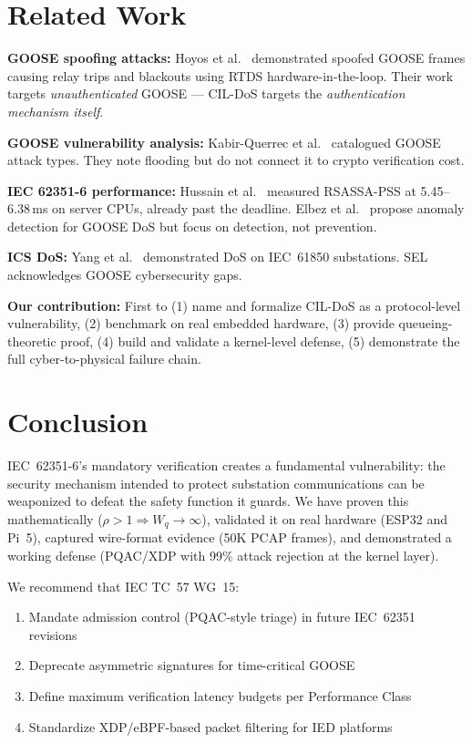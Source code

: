 \documentclass[11pt,a4paper,twocolumn]{article}
\begin{document}
\section{Related Work}
\label{sec:related}

\textbf{GOOSE spoofing attacks:} Hoyos et al.~\cite{tudelft2020} demonstrated spoofed GOOSE frames causing relay trips and blackouts using RTDS hardware-in-the-loop. Their work targets \emph{unauthenticated} GOOSE --- CIL-DoS targets the \emph{authentication mechanism itself}.

\textbf{GOOSE vulnerability analysis:} Kabir-Querrec et al.~\cite{vu2021goose} catalogued GOOSE attack types. They note flooding but do not connect it to crypto verification cost.

\textbf{IEC 62351-6 performance:} Hussain et al.~\cite{iec62351perf} measured RSASSA-PSS at 5.45--6.38\,ms on server CPUs, already past the deadline. Elbez et al.~\cite{kit2020auth} propose anomaly detection for GOOSE DoS but focus on detection, not prevention.

\textbf{ICS DoS:} Yang et al.~\cite{iec61850dos2021} demonstrated DoS on IEC~61850 substations. SEL~\cite{sel2019goose} acknowledges GOOSE cybersecurity gaps.

\textbf{Our contribution:} First to (1) name and formalize CIL-DoS as a protocol-level vulnerability, (2) benchmark on real embedded hardware, (3) provide queueing-theoretic proof, (4) build and validate a kernel-level defense, (5) demonstrate the full cyber-to-physical failure chain.

\section{Conclusion}
\label{sec:conclusion}

IEC~62351-6's mandatory verification creates a fundamental vulnerability: the security mechanism intended to protect substation communications can be weaponized to defeat the safety function it guards. We have proven this mathematically ($\rho > 1 \Rightarrow W_q \to \infty$), validated it on real hardware (ESP32 and Pi~5), captured wire-format evidence (50K PCAP frames), and demonstrated a working defense (PQAC/XDP with 99\% attack rejection at the kernel layer).

We recommend that IEC TC~57 WG~15:
\begin{enumerate}[leftmargin=1.5em,itemsep=1pt]
\item Mandate admission control (PQAC-style triage) in future IEC~62351 revisions
\item Deprecate asymmetric signatures for time-critical GOOSE
\item Define maximum verification latency budgets per Performance Class
\item Standardize XDP/eBPF-based packet filtering for IED platforms
\end{enumerate}
\end{document}
